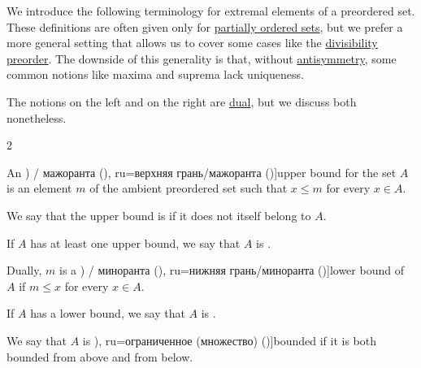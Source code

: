 \begin{definition}\label{def:extremal_points}
  We introduce the following terminology for extremal elements of a preordered set. These definitions are often given only for \hyperref[def:partially_ordered_set]{partially ordered sets}, but we prefer a more general setting that allows us to cover some cases like the \hyperref[thm:semiring_divisibility_order]{divisibility preorder}. The downside of this generality is that, without \hyperref[def:binary_relation/antisymmetric]{antisymmetry}, some common notions like maxima and suprema lack uniqueness.

  The notions on the left and on the right are \hyperref[thm:order_duality]{dual}, but we discuss both nonetheless.

  \begin{thmenum}
    \begin{paracol}{2}
      \begin{leftcolumn}
        An \term[bg=горна граница (\cite[18]{Тагамлицки1971ДиференциалноСмятане}) / мажоранта (\cite[10]{Проданов1982ФункционаленАнализЧаст1}), ru=верхняя грань/мажоранта (\cite[def. 3.8]{Гуров2013ТеорияРешёток})]{upper bound} for the set \( A \) is an element \( m \) of the ambient preordered set such that \( x \leq m \) for every \( x \in A \).

        We say that the upper bound is  if it does not itself belong to \( A \).

        If \( A \) has at least one upper bound, we say that \( A \) is .
      \end{leftcolumn}

      \begin{rightcolumn}
        Dually, \( m \) is a \term[bg=долна граница (\cite[18]{Тагамлицки1971ДиференциалноСмятане}) / миноранта (\cite[10]{Проданов1982ФункционаленАнализЧаст1}), ru=нижняя грань/миноранта (\cite[def. 3.8]{Гуров2013ТеорияРешёток})]{lower bound} of \( A \) if \( m \leq x \) for every \( x \in A \).

        If \( A \) has a lower bound, we say that \( A \) is .

        We say that \( A \) is \term[bg=ограничено (множество) (\cite[19]{Тагамлицки1971ДиференциалноСмятане}), ru=ограниченное (множество) (\cite[39]{Зорич2019АнализЧасть1})]{bounded} if it is both bounded from above and from below.
      \end{rightcolumn}
    \end{paracol}


\end{thmenum}
\end{definition}

